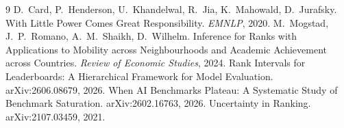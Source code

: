 \documentclass[10pt]{article}
\begin{document}

\begin{thebibliography}{9}
 D.~Card, P.~Henderson, U.~Khandelwal, R.~Jia, K.~Mahowald, D.~Jurafsky. With Little Power Comes Great Responsibility. \emph{EMNLP}, 2020.
 M.~Mogstad, J.~P.~Romano, A.~M.~Shaikh, D.~Wilhelm. Inference for Ranks with Applications to Mobility across Neighbourhoods and Academic Achievement across Countries. \emph{Review of Economic Studies}, 2024.
 Rank Intervals for Leaderboards: A Hierarchical Framework for Model Evaluation. arXiv:2606.08679, 2026.
 When AI Benchmarks Plateau: A Systematic Study of Benchmark Saturation. arXiv:2602.16763, 2026.
 Uncertainty in Ranking. arXiv:2107.03459, 2021.
\end{thebibliography}
\end{document}
